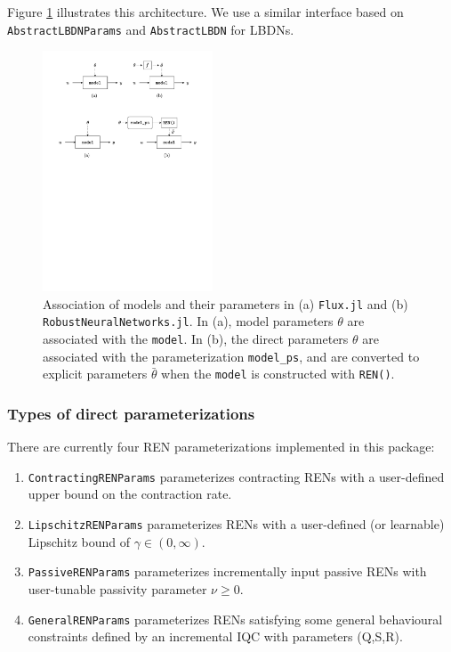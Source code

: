 Figure \ref{fig:ren-params} illustrates this architecture. We use a similar interface based on \verb|AbstractLBDNParams| and \verb|AbstractLBDN| for LBDNs.

\begin{figure}[ht]
    \centering
    \includegraphics[width=0.45\textwidth]{Images/rrn_julia_params.pdf}
    \caption{Association of models and their parameters in (a) \texttt{Flux.jl} and (b) \texttt{RobustNeuralNetworks.jl}. In (a), model parameters $\theta$ are associated with the \texttt{model}. In (b), the direct parameters $\theta$ are associated with the parameterization \texttt{model\_ps}, and are converted to explicit parameters $\bar{\theta}$ when the \texttt{model} is constructed with \texttt{REN()}.}
    \label{fig:ren-params}
\end{figure}

\subsubsection{Types of direct parameterizations} \label{sec:direct-params}

There are currently four REN parameterizations implemented in this package:
\begin{enumerate}
    \item \verb|ContractingRENParams| parameterizes contracting RENs with a user-defined upper bound on the contraction rate.

    \item \verb|LipschitzRENParams| parameterizes RENs with a user-defined (or learnable) Lipschitz bound of $\gamma \in (0,\infty)$.

    \item \verb|PassiveRENParams| parameterizes incrementally input passive RENs with user-tunable passivity parameter $\nu \ge 0$.

    \item \verb|GeneralRENParams| parameterizes RENs satisfying some general behavioural constraints defined by an incremental IQC with parameters (Q,S,R).
    
\end{enumerate}

